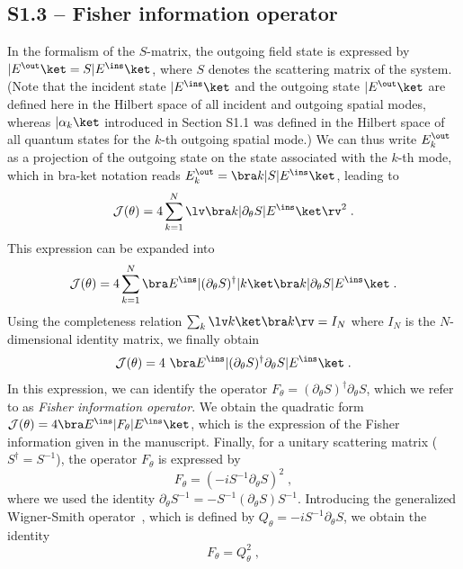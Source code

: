 \documentclass[aps,pra,twocolumn,amsmath,amssymb,superscriptaddress,10pt,nobibnotes]{revtex4-2}
\begin{document}
\subsection*{S1.3 -- Fisher information operator}
In the formalism of the $S$-matrix, the outgoing field state is expressed by $|E^\out\ket=S |E^\ins\ket$, where $S$ denotes the scattering matrix of the system. (Note that the incident state $|E^\ins\ket$ and the outgoing state $|E^\out\ket$ are defined here in the Hilbert space of all incident and outgoing spatial modes, whereas $|\alpha_k\ket$ introduced in Section S1.1 was defined in the Hilbert space of all quantum states for the $k$-th outgoing spatial mode.) We can thus write $E_k^\out$ as a projection of the outgoing state on the state associated with the $k$-th mode, which in bra-ket notation reads $E_k^\out=\bra k | S | E^\ins \ket$, leading to
\begin{equation}
\mathcal{J}(\theta)= 4 \sum_{k=1}^N \lv \bra k | \partial_\theta S | E^\ins \ket \rv^2 \; .
\end{equation}
This expression can be expanded into 
\begin{equation}
\mathcal{J}(\theta)= 4 \sum_{k=1}^N \bra E^\ins | (\partial_\theta S) ^\dagger |k \ket \bra k | \partial_\theta S | E^\ins \ket \; .
\end{equation}
Using the completeness relation $\sum_k \lv k \ket \bra k \rv =I_N$ where $I_N$ is the $N$-dimensional identity matrix, we finally obtain
\begin{equation}
\mathcal{J}(\theta)= 4 \ \bra E^\ins | (\partial_\theta S) ^\dagger \partial_\theta S | E^\ins \ket \; .
\label{eq_fisher_smatrix}
\end{equation}
In this expression, we can identify the operator $F_\theta = (\partial_\theta S) ^\dagger \partial_\theta S $, which we refer to as \textit{Fisher information operator}. We obtain the quadratic form $\mathcal{J}(\theta)= 4 \bra E^\ins | F_\theta | E^\ins \ket $, which is the expression of the Fisher information given in the manuscript. Finally, for a unitary scattering matrix ($S^\dagger=S^{-1}$), the operator $F_\theta$ is expressed by
\begin{equation}
F_\theta=(-i S^{-1} \partial_\theta S)^2 \; ,
\end{equation}
where we used the identity $\partial_\theta S^{-1} = - S^{-1} (\partial_\theta S) S^{-1}$. Introducing the generalized Wigner-Smith operator~\cite{ambichl_focusing_2017_1}, which is defined by $Q_\theta=-iS^{-1} \partial_\theta S$, we obtain the identity 
\begin{equation}
F_\theta= Q_\theta^2 \; ,  
\end{equation}
\end{document}
